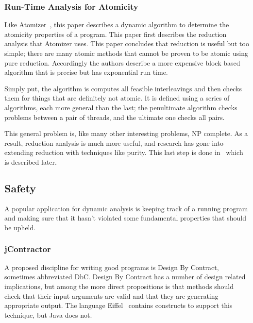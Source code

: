 \documentclass{article}
\begin{document}
\begin{multicols}{2}
\subsubsection{Run-Time Analysis for Atomicity~\cite{wang03runtimeRV}}

Like Atomizer~\cite{964023}, this paper describes a dynamic algorithm
to determine the atomicity properties of a program.  This paper first
describes the reduction analysis that Atomizer uses.  This paper
concludes that reduction is useful but too simple; there are many
atomic methods that cannot be proven to be atomic using pure
reduction.  Accordingly the authors describe a more expensive block
based algorithm that is precise but has exponential run time.

Simply put, the algorithm is computes all feasible interleavings and
then checks them for things that are definitely not atomic.  It is
defined using a series of algorithms, each more general than the last;
the penultimate algorithm checks problems between a pair of threads,
and the ultimate one checks all pairs.

This general problem is, like many other interesting problems, NP
complete.  As a result, reduction analysis is much more useful, and
research has gone into extending reduction with techniques like
purity.  This last step is done in~\cite{1007543} which is described
later.

\subsection{Safety}

A popular application for dynamic analysis is keeping track of a
running program and making sure that it hasn't violated some
fundamental properties that should be upheld.

\subsubsection{jContractor~\cite{karaorman99jcontractor}}

A proposed discipline for writing good programs is Design By
Contract\cite{meyer92applying}, sometimes abbreviated DbC.  Design By
Contract has a number of design related implications, but among the
more direct propositions is that methods should check that their input
arguments are valid and that they are generating appropriate output.
The language Eiffel~\cite{meyer92eiffel} contains constructs to
support this technique, but Java does not.


\end{multicols}
\end{document}
